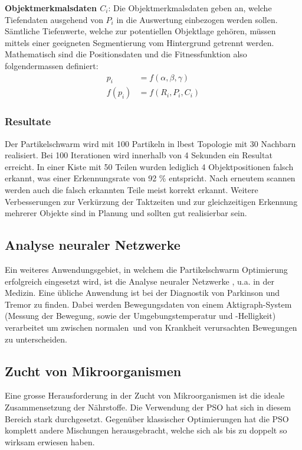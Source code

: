\textbf{Objektmerkmalsdaten $C_i$}: Die Objektmerkmalsdaten geben an, welche Tiefendaten ausgehend von $P_i$ in die Auswertung einbezogen werden sollen. Sämtliche Tiefenwerte, welche zur potentiellen Objektlage gehören, müssen mittels einer geeigneten Segmentierung vom Hintergrund getrennt werden. \\

Mathematisch sind die Positionsdaten und die Fitnessfunktion also folgendermassen definiert: 
\begin{align}
	p_i &= f(\alpha ,\beta ,\gamma) \\
	f(p_i) &= f(R_i,P_i,C_i)
\end{align}

\subsubsection{Resultate}
Der Partikelschwarm wird mit 100 Partikeln in lbest Topologie mit 30 Nachbarn realisiert. Bei 100 Iterationen wird innerhalb von 4 Sekunden ein Resultat erreicht. In einer Kiste mit 50 Teilen wurden lediglich 4 Objektpositionen falsch erkannt, was einer Erkennungsrate von 92 \% entspricht. Nach erneutem scannen werden auch die falsch erkannten Teile meist korrekt erkannt. Weitere Verbesserungen zur Verkürzung der Taktzeiten und zur gleichzeitigen Erkennung  mehrerer Objekte sind in Planung und sollten gut realisierbar sein.

\subsection{Analyse neuraler Netzwerke}
Ein weiteres Anwendungsgebiet, in welchem die Partikelschwarm Optimierung erfolgreich eingesetzt wird, ist die Analyse neuraler Netzwerke , u.a. in der Medizin. Eine übliche Anwendung ist bei der Diagnostik von Parkinson und Tremor zu finden. Dabei werden Bewegungsdaten von einem Aktigraph-System (Messung der Bewegung, sowie der Umgebungstemperatur und -Helligkeit) verarbeitet um zwischen \textacutedbl normalen\textacutedbl \ und von Krankheit verursachten Bewegungen zu unterscheiden. \cite{Shi-Appl}

\subsection{Zucht von Mikroorganismen}
Eine grosse Herausforderung in der Zucht von Mikroorganismen ist die ideale Zusammensetzung der Nährstoffe. Die Verwendung der PSO hat sich in diesem Bereich stark durchgesetzt. Gegenüber klassischer Optimierungen hat die PSO komplett andere Mischungen herausgebracht, welche sich als bis zu doppelt so wirksam erwiesen haben. \cite{Shi-Appl}